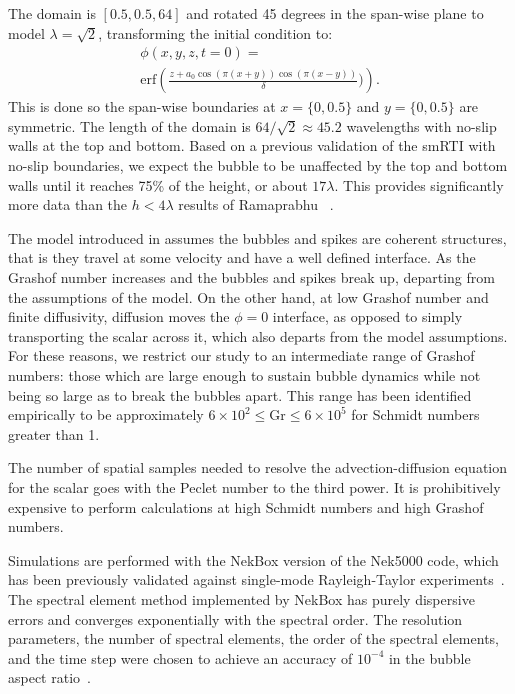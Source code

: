 The domain is $\left[0.5, 0.5, 64\right]$ and rotated 45 degrees in the span-wise plane to model $\lambda = \sqrt{2}$, transforming the initial condition to:
\begin{equation}
\begin{split}
	\phi(x,y,z,t=0) = \\
	\text{erf}\left(\frac{z + a_0 \cos(\pi (x+y)) \cos(\pi (x-y))}{\delta})\right).
\end{split}
\end{equation}
This is done so the span-wise boundaries at $x=\{0,0.5\}$ and $y=\{0,0.5\}$ are symmetric.
The length of the domain is $64/\sqrt{2} \approx 45.2$ wavelengths with no-slip walls at the top and bottom.
Based on a previous validation of the smRTI with no-slip boundaries, we expect the bubble to be unaffected by the top and bottom walls until it reaches 75\% of the height, or about $17\lambda$.
This provides significantly more data than the $h < 4 \lambda$ results of Ramaprabhu \etal~\cite{Ramaprabhu2012}.

The model introduced in  assumes the bubbles and spikes are coherent structures, that is they travel at some velocity and have a well defined interface.
As the Grashof number increases and the bubbles and spikes break up, departing from the assumptions of the model.
On the other hand, at low Grashof number and finite diffusivity, diffusion moves the $\phi = 0$ interface, as opposed to simply transporting the scalar across it, which also departs from the model assumptions.
For these reasons, we restrict our study to an intermediate range of Grashof numbers: those which are large enough to sustain bubble dynamics while not being so large as to break the bubbles apart.
This range has been identified empirically to be approximately $6 \times 10^2 \le \text{Gr} \le 6 \times 10^5$ for Schmidt numbers greater than 1.

The number of spatial samples needed to resolve the advection-diffusion equation for the scalar goes with the Peclet number to the third power.
It is prohibitively expensive to perform calculations at high Schmidt numbers and high Grashof numbers.  

Simulations are performed with the NekBox version of the Nek5000 code, which has been previously validated against single-mode Rayleigh-Taylor experiments~\cite{Hutchinson2016,Wilkinson2007}.
The spectral element method implemented by NekBox has purely dispersive errors and converges exponentially with the spectral order.
The resolution parameters, the number of spectral elements, the order of the spectral elements, and the time step were chosen to achieve an accuracy of $10^{-4}$ in the bubble aspect ratio~\cite{hutchinson2016efficiency}.

